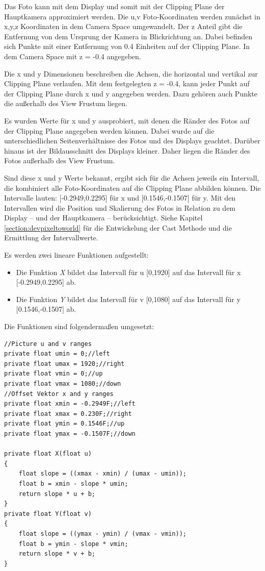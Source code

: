Das Foto kann mit dem Display und somit mit der Clipping Plane der Hauptkamera approximiert werden.
Die u,v Foto-Koordinaten werden zunächst in x,y,z Koordinaten in dem Camera Space umgewandelt. Der z Anteil gibt die Entfernung von dem Ursprung der Kamera in Blickrichtung an. Dabei befinden sich Punkte mit einer Entfernung von 0.4 Einheiten auf der Clipping Plane. In dem Camera Space mit z = -0.4 angegeben. 

Die x und y Dimensionen beschreiben die Achsen, die horizontal und vertikal zur Clipping Plane verlaufen. Mit dem festgelegten z = -0.4, kann jeder Punkt auf der Clipping Plane durch x und y angegeben werden. Dazu gehören auch Punkte die außerhalb des View Frustum liegen.

Es wurden Werte für x und y ausprobiert, mit denen die Ränder des Fotos auf der Clipping Plane angegeben werden können. Dabei wurde auf die unterschiedlichen Seitenverhältnisse des Fotos und des Displays geachtet. Darüber hinaus ist der Bildausschnitt des Displays kleiner. Daher liegen die Ränder des Fotos außerhalb des View Frustum. 

Sind diese x und y Werte bekannt, ergibt sich für die Achsen jeweils ein Intervall, die kombiniert alle Foto-Koordinaten auf die Clipping Plane abbilden können. Die Intervalle lauten: [-0.2949,0.2295] für x und [0.1546,-0.1507] für y. Mit den Intervallen wird die Position und Skalierung des Fotos in Relation zu dem Display – und der Hauptkamera –  berücksichtigt. Siehe Kapitel \ref{section:devpixeltoworld} für die Entwickelung der Cast Methode und die Ermittlung der Intervallwerte.

Es werden zwei lineare Funktionen aufgestellt:
\begin{itemize}
	\item Die Funktion \textit{X} bildet das Intervall für u [0,1920] auf das Intervall für x [-0.2949,0.2295] ab.
	\item Die Funktion \textit{Y} bildet das Intervall für v [0,1080] auf das Intervall für y [0.1546,-0.1507] ab.
\end{itemize}

Die Funktionen sind folgendermaßen umgesetzt:

\begin{lstlisting}
//Picture u and v ranges
private float umin = 0;//left
private float umax = 1920;//right
private float vmin = 0;//up
private float vmax = 1080;//down
//Offset Vektor x and y ranges
private float xmin = -0.2949F;//left
private float xmax = 0.230F;//right
private float ymin = 0.1546F;//up
private float ymax = -0.1507F;//down

private float X(float u)
{
	float slope = ((xmax - xmin) / (umax - umin));
	float b = xmin - slope * umin;
	return slope * u + b;
}
private float Y(float v)
{
	float slope = ((ymax - ymin) / (vmax - vmin));
	float b = ymin - slope * vmin;
	return slope * v + b;
}
\end{lstlisting}

